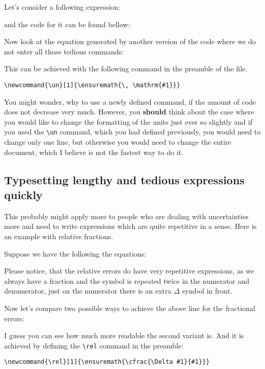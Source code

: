 \documentclass[
    draft
]{scrartcl}
\newcommand{\un}[1]{\unit{#1}}
\begin{document}
Let's consider a following expression:

and the code for it can be found bellow:


Now look at the equation generated by another version of the code where we do
not enter all those tedious commands:



This can be achieved with the following command in the preamble of the file.
\begin{lstlisting}
\newcommand{\un}[1]{\ensuremath{\, \mathrm{#1}}}
\end{lstlisting}

You might wonder, why to use a newly defined command, if the amount of code
does not decrease very much. However, you \textbf{should} think about the case
where you would like to change the formatting of the units just ever so slightly
and if you used the \verb|\un| command, which you had defined previously, you
would need to change only one line, but otherwise you would need to change the
entire document, which I believe is not the fastest way to do it.

\subsection{Typesetting lengthy and tedious expressions quickly}

This probably might apply more to people who are dealing with uncertainties more
and need to write expressions which are quite repetitive in a sense. Here is an
example with relative fractions.

Suppose we have the following the equations:


Please notice, that the relative errors do have very repetitive expressions,
as we always have a fraction and the symbol is repeated twice in the numerator
and denumerator, just on the numerator there is an extra $\Delta$ symbol in
front.

Now let's compare two possible ways to achieve the above line for the fractional
errors:



I guess you can see how much more readable the second variant is. And it is
achieved by defining the \verb|\rel| command in the preamble:
\begin{lstlisting}
\newcommand{\rel}[1]{\ensuremath{\cfrac{\Delta #1}{#1}}}
\end{lstlisting}
\end{document}
